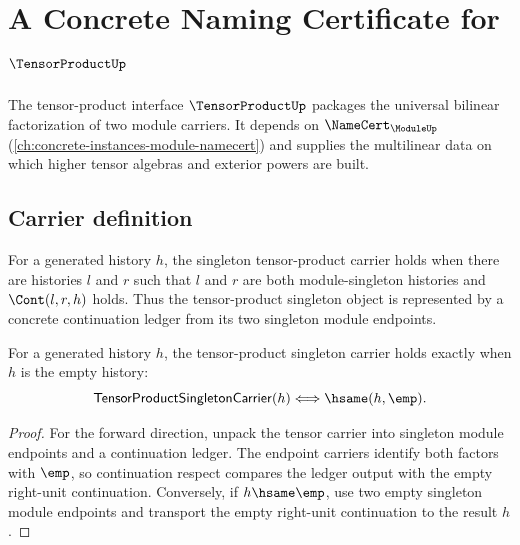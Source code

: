 \chapter{A Concrete Naming Certificate for $\TensorProductUp$}
\label{ch:concrete-instances-tensorproduct-namecert}

The tensor-product interface $\TensorProductUp$ packages the universal bilinear factorization of two module carriers. It depends on $\NameCert_{\ModuleUp}$ (\autoref{ch:concrete-instances-module-namecert}) and supplies the multilinear data on which higher tensor algebras and exterior powers are built.

\section{Carrier definition}
\label{sec:tensorproduct-carrier}

\begin{definition}\label{def:tensorproduct-singleton-carrier}
For a generated history $h$, the singleton tensor-product carrier holds when there are
histories $l$ and $r$ such that $l$ and $r$ are both module-singleton histories and
$\Cont(l,r,h)$ holds. Thus the tensor-product singleton object is represented by a
concrete continuation ledger from its two singleton module endpoints.
\end{definition}

\begin{theorem}
\label{thm:tensorproduct-singleton-carrier-empty-iff}
For a generated history $h$, the tensor-product singleton carrier holds exactly
when $h$ is the empty history:
$$
\mathsf{TensorProductSingletonCarrier}(h)\Longleftrightarrow \hsame(h,\emp).
$$
\end{theorem}
\begin{proof}
For the forward direction, unpack the tensor carrier into singleton module
endpoints and a continuation ledger. The endpoint carriers identify both
factors with $\emp$, so continuation respect compares the ledger output with
the empty right-unit continuation. Conversely, if $h\hsame\emp$, use two
empty singleton module endpoints and transport the empty right-unit continuation
to the result $h$.
\end{proof}

